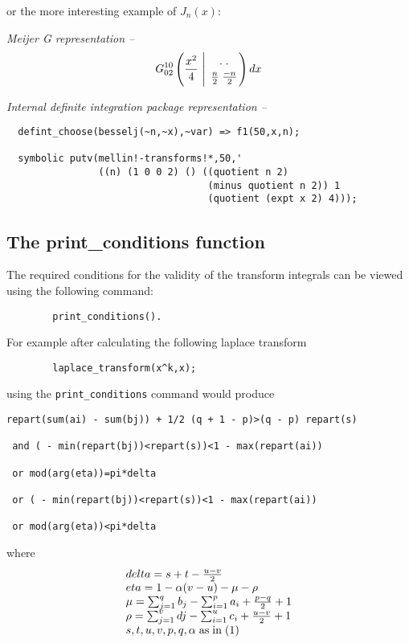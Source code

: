 or the more interesting example of $J_{n}(x)$:

{\it Meijer G representation --}
\[
G^{1 0}_{0 2} \left(\frac{x^{2}}{4} \ \Bigg\vert
\ \MeijerGparams{. \; .}{\frac{n}{2} \; {\frac{-n}{2}}} \right) dx
\]

{\it Internal definite integration package representation --}

\begin{verbatim}
  defint_choose(besselj(~n,~x),~var) => f1(50,x,n);

  symbolic putv(mellin!-transforms!*,50,'
                ((n) (1 0 0 2) () ((quotient n 2)
                                   (minus quotient n 2)) 1
                                   (quotient (expt x 2) 4)));
\end{verbatim} 

\subsection{The print\_conditions function}

The required conditions for the validity of the transform integrals
can be viewed using the following command:

\begin{verbatim}
        print_conditions().
\end{verbatim}

For example after calculating the following laplace transform

\begin{verbatim}
        laplace_transform(x^k,x);
\end{verbatim}

using the \verb+print_conditions+ command would produce

\begin{verbatim}
repart(sum(ai) - sum(bj)) + 1/2 (q + 1 - p)>(q - p) repart(s)

 and ( - min(repart(bj))<repart(s))<1 - max(repart(ai))

 or mod(arg(eta))=pi*delta

 or ( - min(repart(bj))<repart(s))<1 - max(repart(ai))

 or mod(arg(eta))<pi*delta
\end{verbatim}

where
\[
\begin{array}{l}
delta = s+t-\frac{u-v}{2}\\
eta = 1-\alpha(v-u)-\mu-\rho\\
\mu = \sum_{j=1}^{q} b_{j} - \sum_{i=1}^{p} a_{i} + \frac{p-q}{2} + 1\\
\rho = \sum_{j=1}^{v} d{j} - \sum_{i=1}^{u} c_{i} + \frac{u-v}{2} + 1\\
s,t,u,v,p,q,\alpha \; {\rm as \; in \; (1)}
\end{array}
\]


